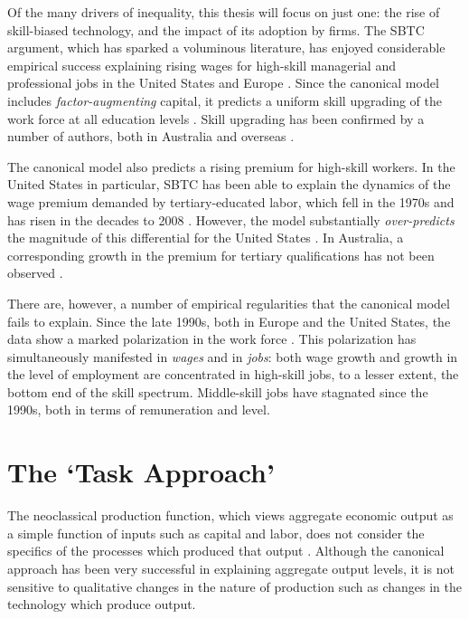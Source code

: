 Of the many drivers of inequality, this thesis will focus on just one: the rise of skill-biased technology, and the impact of its adoption by firms. The SBTC argument, which has sparked a voluminous literature, has enjoyed considerable empirical success explaining rising wages for high-skill managerial and professional jobs in the United States and Europe \citep{Katz1992}. Since the canonical model includes \emph{factor-augmenting} capital, it predicts a uniform skill upgrading of the work force at all education levels \citep{Levy2003}. Skill upgrading has been confirmed by a number of authors, both in Australia \citep{Esposto2012, Wooden2000, Cully1999} and overseas \citep{Autor2008}. 

The canonical model also predicts a rising premium for high-skill workers. In the United States in particular, SBTC has been able to explain the dynamics of the wage premium demanded by tertiary-educated labor, which fell in the 1970s and has risen in the decades to 2008 \citep{Acemoglu2011}. However, the model substantially \emph{over-predicts} the magnitude of this differential for the United States \citep{Autor2008}. In Australia, a corresponding growth in the premium for tertiary qualifications has not been observed \citep{Coelli2009}.

There are, however, a number of empirical regularities that the canonical model fails to explain. Since the late 1990s, both in Europe and the United States, the data show a marked polarization in the work force \citep{Goos2007, Autor2006}. This polarization has simultaneously manifested in \emph{wages} and in \emph{jobs}: both wage growth and growth in the level of employment are concentrated in high-skill jobs, to a lesser extent, the bottom end of the skill spectrum. Middle-skill jobs have stagnated since the 1990s, both in terms of remuneration and level.

\section{The `Task Approach'}

The neoclassical production function, which views aggregate economic output as a simple function of inputs such as capital and labor, does not consider the specifics of the processes which produced that output \citep{Acemoglu2011}. Although the canonical approach has been very successful in explaining aggregate output levels, it is not sensitive to qualitative changes in the nature of production such as changes in the technology which produce output. 

